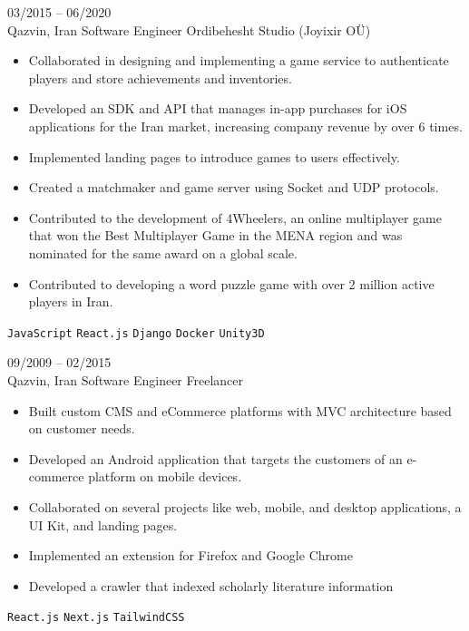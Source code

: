 \documentclass[8pt]{developercv} %
\begin{document}
\begin{entrylist}
        \entry
        {03/2015 -- 06/2020 \\ Qazvin, Iran}
        {Software Engineer}
        {Ordibehesht Studio {\small (Joyixir OÜ)}}
        {\vspace{-10pt}
            \begin{itemize}[noitemsep,topsep=0pt,parsep=0pt,partopsep=0pt, leftmargin=-1pt]
                \item Collaborated in designing and implementing a game service to authenticate players and store achievements and inventories.
                \item Developed an SDK and API that manages in-app purchases for iOS applications for the Iran market, increasing company revenue by over 6 times.
                \item Implemented landing pages to introduce games to users effectively.
                \item Created a matchmaker and game server using Socket and UDP protocols.
                \item Contributed to the development of 4Wheelers, an online multiplayer game that won the Best Multiplayer Game in the MENA region and was nominated for the same award on a global scale.
                \item Contributed to developing a word puzzle game with over 2 million active players in Iran.
            \end{itemize}
            \texttt{JavaScript} \slashsep \texttt{React.js} \slashsep \texttt{Django} \slashsep \texttt{Docker} \slashsep \texttt{Unity3D}
        }

        \entry
        {09/2009 -- 02/2015 \\ Qazvin, Iran}
        {Software Engineer}
        {Freelancer}
        {\vspace{-10pt}
            \begin{itemize}[noitemsep,topsep=0pt,parsep=0pt,partopsep=0pt, leftmargin=-1pt]
                \item Built custom CMS and eCommerce platforms with MVC architecture based on customer needs.
                \item Developed an Android application that targets the customers of an e-commerce platform on mobile devices.
                \item Collaborated on several projects like web, mobile, and desktop applications, a UI Kit, and landing pages.
                \item Implemented an extension for Firefox and Google Chrome
                \item Developed a crawler that indexed scholarly literature information
            \end{itemize}
            \texttt{React.js} \slashsep \texttt{Next.js} \slashsep \texttt{TailwindCSS}
        }
    \end{entrylist}
\end{document}
